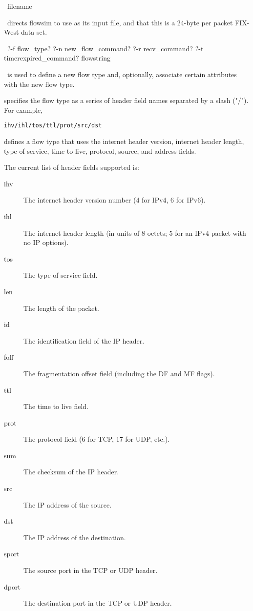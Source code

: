 \documentclass{article}
\begin{document}
\manend


\SYNOPSIS \cmdname\ filename

\DESCRIPTION

\cmdname\ directs flowsim to use  as
its input file, and that this is a 24-byte per packet FIX-West data
set.

\SEEALSO


\manend


\SYNOPSIS \cmdname\ ?-f flow\_type? ?-n new\_flow\_command? ?-r recv\_command? ?-t timerexpired\_command? flowstring

\DESCRIPTION

\cmdname\ is used to define a new flow type and, optionally, associate
certain attributes with the new flow type.

 specifies the flow type as a series of header field
names separated by a slash ("/").  For example, \begin{verbatim}
ihv/ihl/tos/ttl/prot/src/dst\end{verbatim} defines a flow type that
uses the internet header version, internet header length, type of
service, time to live, protocol, source, and address fields.

The current list of header fields supported is:
\begin{description}
\item[ihv] The internet header version number (4 for IPv4, 6 for IPv6).
\item[ihl] The internet header length (in units of 8 octets; 5 for an
IPv4 packet with no IP options).
\item[tos] The type of service field.
\item[len] The length of the packet.
\item[id] The identification field of the IP header.
\item[foff] The fragmentation offset field (including the DF and MF
flags).
\item[ttl] The time to live field.
\item[prot] The protocol field (6 for TCP, 17 for UDP, etc.).
\item[sum] The checksum of the IP header.
\item[src] The IP address of the source.
\item[dst] The IP address of the destination.
\item[sport] The source port in the TCP or UDP header.
\item[dport] The destination port in the TCP or UDP header.
\end{description}
\end{document}
